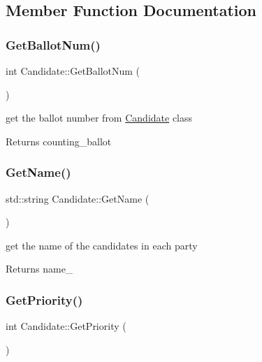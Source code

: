 \subsection{Member Function Documentation}
\mbox{\label{classCandidate_ab7922ab28b022c85b1a2f9743be4714c}} 
\subsubsection{\texorpdfstring{Get\+Ballot\+Num()}{GetBallotNum()}}
{\footnotesize\ttfamily int Candidate\+::\+Get\+Ballot\+Num (\begin{DoxyParamCaption}{ }\end{DoxyParamCaption})}



get the ballot number from \hyperlink{classCandidate}{Candidate} class 

\begin{DoxyReturn}{Returns}
counting\+\_\+ballot 
\end{DoxyReturn}
\mbox{\label{classCandidate_ad97f7ac3672bab8b72b7b7755fa10e0e}} 
\subsubsection{\texorpdfstring{Get\+Name()}{GetName()}}
{\footnotesize\ttfamily std\+::string Candidate\+::\+Get\+Name (\begin{DoxyParamCaption}{ }\end{DoxyParamCaption})}



get the name of the candidates in each party 

\begin{DoxyReturn}{Returns}
name\+\_\+ 
\end{DoxyReturn}
\mbox{\label{classCandidate_a26abbe93bfda7c101567b3679994e51a}} 
\subsubsection{\texorpdfstring{Get\+Priority()}{GetPriority()}}
{\footnotesize\ttfamily int Candidate\+::\+Get\+Priority (\begin{DoxyParamCaption}{ }\end{DoxyParamCaption})}



